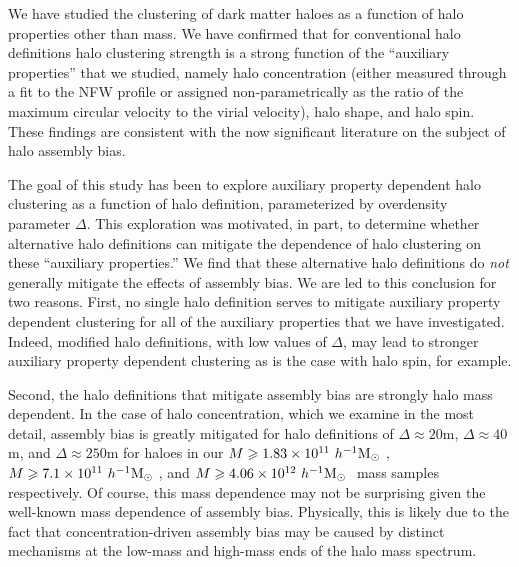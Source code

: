 \documentclass[usenatbib,fleqn]{mnras}
\begin{document}
We have studied the clustering of dark matter haloes as a function of halo properties other than mass. We have confirmed that for conventional halo definitions halo clustering strength is a strong function of the  ``auxiliary properties'' that we studied, namely halo concentration (either measured through a fit to the NFW profile or assigned non-parametrically as the ratio of the maximum circular velocity to the virial velocity), halo shape, and halo spin. These findings are consistent with the now significant literature on the subject of halo assembly bias. \citep[e.g.,][]{peacock_smith00, wechsler_etal02,sheth_tormen04, gao_etal05, zentner_etal05, allgood_etal06, harker_etal06, wechsler_etal06, croton_etal07, zentner07, dalal_etal08, lacerna_padilla12, zentner_etal14, mao_etal15, sunayama_etal16}

The goal of this study has been to explore auxiliary property dependent halo clustering as a function of halo definition, parameterized by overdensity parameter $\Delta$. This exploration was motivated, in part, to determine whether alternative halo definitions can mitigate the dependence of halo clustering on these ``auxiliary properties.'' We find that these alternative halo definitions do {\em not} generally mitigate the effects of assembly bias. We are led to this conclusion for two reasons. First, no single halo definition serves to mitigate auxiliary property dependent clustering for all of the auxiliary properties that we have investigated. Indeed, modified halo definitions, with low values of $\Delta$, may lead to stronger auxiliary property dependent clustering as is the case with halo spin, for example.

Second, the halo definitions that mitigate assembly bias are strongly halo mass dependent. In the case of halo concentration, which we examine in the most detail, assembly bias is greatly mitigated for halo definitions of $\Delta \approx 20$m, $\Delta \approx 40$m, and $\Delta \approx 250$m for haloes in our $M \geqslant 1.83 \times 10^{11} \ h^{-1}\mathrm{M}_{\odot}~$, $M \geqslant 7.1 \times 10^{11} \ h^{-1}\mathrm{M}_{\odot}~$, and $M \geqslant 4.06 \times 10^{12} \ h^{-1}\mathrm{M}_{\odot}~$ mass samples respectively. Of course, this mass dependence may not be surprising given the well-known mass dependence of assembly bias. Physically, this is likely due to the fact that concentration-driven assembly bias may be caused by distinct mechanisms at the low-mass \citep[e.g., see][]{wang_etal07,dalal_etal08,warnick_etal08,hahn_etal09,ludlow_etal09,sunayama_etal16} and high-mass \citep[e.g.,][]{zentner07,dalal_etal08} ends of the halo mass spectrum. 
\end{document}
